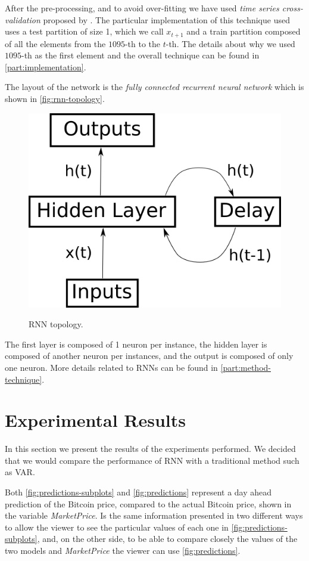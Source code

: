 After the pre-processing, and to avoid over-fitting we have used
\textit{time series cross-validation} proposed by
\cite{robjhyndman2010}. The particular implementation of this
technique used uses a test partition of size 1, which we call
$x_{t + 1}$ and a train partition composed of all the elements from
the $1095$-th to the $t$-th. The details about why we used $1095$-th
as the first element and the overall technique can be found in
\autoref{part:implementation}.

The layout of the network is the \textit{fully connected recurrent
  neural network} which is shown in \autoref{fig:rnn-topology}.

\begin{figure}[bth]
  \myfloatalign
  {\includegraphics[width=.5\linewidth]
    {gfx/rnn-topology}}
  \caption{RNN topology.}
  \label{fig:rnn-topology}
\end{figure}

The first layer is composed of 1 neuron per instance, the hidden layer
is composed of another neuron per instances, and the output is
composed of only one neuron. More details related to RNNs can be found
in \autoref{part:method-technique}.


\chapter{Experimental Results}
\label{ch:experimental-results}

In this section we present the results of the experiments performed.
We decided that we would compare the performance of RNN with a
traditional method such as VAR.

Both \autoref{fig:predictions-subplots} and \autoref{fig:predictions}
represent a day ahead prediction of the Bitcoin price, compared to the
actual Bitcoin price, shown in the variable \textit{MarketPrice}. Is
the same information presented in two different ways to allow the
viewer to see the particular values of each one in
\autoref{fig:predictions-subplots}, and, on the other side, to be able
to compare closely the values of the two models and
\textit{MarketPrice} the viewer can use \autoref{fig:predictions}.

